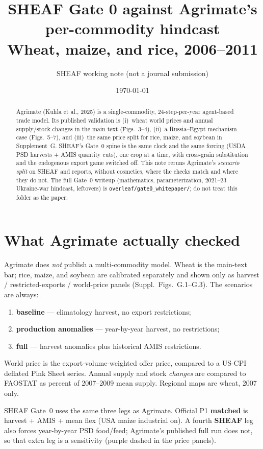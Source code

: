 \documentclass[11pt,a4paper]{article}
\title{SHEAF Gate 0 against Agrimate's per-commodity hindcast\\
\large Wheat, maize, and rice, 2006--2011}
\author{SHEAF working note (not a journal submission)}
\date{\today}
\begin{document}
\maketitle

\begin{abstract}
Agrimate (Kuhla et al., 2025) is a single-commodity, 24-step-per-year agent-based
trade model. Its published validation is (i)~wheat world prices and annual
supply/stock changes in the main text (Figs.~3--4), (ii)~a Russia--Egypt
mechanism case (Figs.~5--7), and (iii)~the same price split for rice, maize, and
soybean in Supplement~G. SHEAF's Gate~0 spine is the same clock and the same
forcing (USDA PSD harvests + AMIS quantity cuts), one crop at a time, with
cross-grain substitution and the endogenous export game switched off.
This note reruns Agrimate's \emph{scenario split} on SHEAF and reports, without
cosmetics, where the checks match and where they do not.
The full Gate~0 writeup (mathematics, parameterization, 2021--23 Ukraine-war
hindcast, leftovers) is \texttt{overleaf/gate0\_whitepaper/}; do not treat this
folder as the paper.
\end{abstract}

\section{What Agrimate actually checked}

Agrimate does \emph{not} publish a multi-commodity model. Wheat is the main-text
bar; rice, maize, and soybean are calibrated separately and shown only as
harvest / restricted-exports / world-price panels (Suppl.\ Figs.~G.1--G.3).
The scenarios are always:
\begin{enumerate}
  \item \textbf{baseline} --- climatology harvest, no export restrictions;
  \item \textbf{production anomalies} --- year-by-year harvest, no restrictions;
  \item \textbf{full} --- harvest anomalies plus historical AMIS restrictions.
\end{enumerate}
World price is the export-volume-weighted offer price, compared to a US-CPI
deflated Pink Sheet series. Annual supply and stock \emph{changes} are compared
to FAOSTAT as percent of 2007--2009 mean supply. Regional maps are wheat, 2007
only.

SHEAF Gate~0 uses the same three legs as Agrimate. Official P1 \textbf{matched}
is harvest + AMIS + mean flex (USA maize industrial on). A fourth \textbf{SHEAF}
leg also forces year-by-year PSD food/feed; Agrimate's published full run does
not, so that extra leg is a sensitivity (purple dashed in the price panels).
\end{document}
